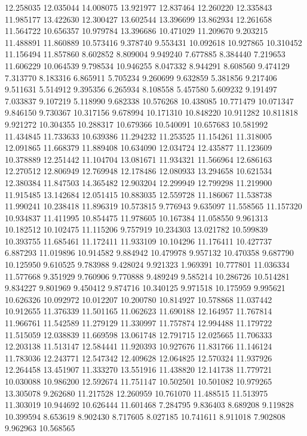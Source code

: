 12.258035
12.035044
14.008075
13.921977
12.837464
12.260220
12.335843
11.985177
13.422630
12.300427
13.602544
13.396699
13.862934
12.261658
11.564722
10.656357
10.979784
13.396686
10.471029
11.209670
9.203215
11.488891
11.860889
10.573416
9.378740
9.553431
10.092618
10.927865
10.310452
11.156494
11.857860
8.602852
8.809004
9.949240
7.677885
8.384440
7.219653
11.606229
10.064539
9.798534
10.946255
8.047332
8.944291
8.608560
9.474129
7.313770
8.183316
6.865911
5.705234
9.260699
9.632859
5.381856
9.217406
9.511631
5.514912
9.395356
6.265934
8.108558
5.457580
5.609232
9.191497
7.033837
9.107219
5.118990
9.682338
10.576268
10.438085
10.771479
10.071347
9.846150
9.730367
10.317156
9.678994
10.171310
10.848220
10.911282
10.811818
9.921272
10.304355
10.288317
10.679366
10.540091
10.657683
10.581992
11.434845
11.733633
10.639386
11.294232
11.253525
11.154261
11.318005
12.091865
11.668379
11.889408
10.634090
12.034724
12.435877
11.123609
10.378889
12.251442
11.104704
13.081671
11.934321
11.566964
12.686163
12.270512
12.806949
12.769948
12.178486
12.080933
13.294658
10.621534
12.380384
11.847503
14.365482
12.903204
12.299949
12.799298
11.219900
11.915485
13.142684
12.051415
10.883035
12.559728
11.186067
11.538738
11.990241
10.238418
11.896319
10.573815
9.776943
9.635097
11.558565
11.157320
10.934837
11.411995
10.854475
11.978605
10.167384
11.058550
9.961313
10.182512
10.102475
11.115206
9.757919
10.234303
13.021782
10.599839
10.393755
11.685461
11.172411
11.933109
10.104296
11.176411
10.427737
6.887293
11.019896
10.914582
9.884942
10.479978
9.957132
10.470358
9.687790
10.125950
9.610525
9.783988
9.428024
9.921323
1.969391
10.777801
11.036334
11.577668
9.351929
9.760906
9.770888
9.489249
9.585214
10.286726
10.514281
9.834227
9.801969
9.450412
9.874716
10.340125
9.971518
10.175959
9.995621
10.626326
10.092972
10.012207
10.200780
10.814927
10.578868
11.037442
10.912655
11.376339
11.501165
11.062623
11.690188
12.164957
11.767814
11.966761
11.542589
11.279129
11.330997
11.757874
12.994488
11.179722
11.515059
12.038839
11.669598
13.061748
12.791715
12.025665
11.706333
12.203138
11.513147
12.584441
11.920393
10.927676
11.831766
11.146124
11.783036
12.243771
12.547342
12.409628
12.064825
12.570324
11.937926
12.264458
13.451907
11.333270
13.551916
11.438820
12.141738
11.779721
10.030088
10.986200
12.592674
11.751147
10.502501
10.501082
10.979265
13.305078
9.262680
11.217528
12.260959
10.761070
11.488515
11.513975
11.303019
10.944692
10.626444
11.601468
7.284795
9.836403
8.689208
9.119828
10.399594
8.653619
8.902430
8.717605
8.027185
10.741611
8.911018
7.902808
9.962963
10.568565

